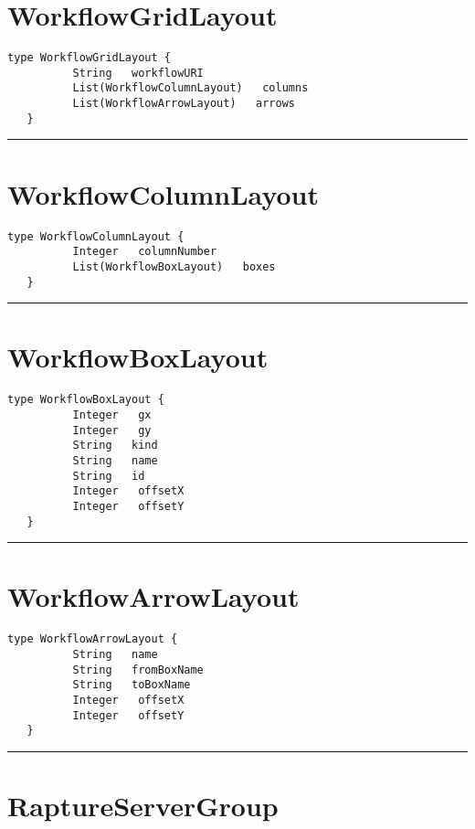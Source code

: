 \section{WorkflowGridLayout}
\label{type:WorkflowGridLayout}

\begin{lstlisting}[style=nonumbers]
   type WorkflowGridLayout {
          String   workflowURI
          List(WorkflowColumnLayout)   columns
          List(WorkflowArrowLayout)   arrows
   }
\end{lstlisting}

\rule{12cm}{2pt}
\section{WorkflowColumnLayout}
\label{type:WorkflowColumnLayout}

\begin{lstlisting}[style=nonumbers]
   type WorkflowColumnLayout {
          Integer   columnNumber
          List(WorkflowBoxLayout)   boxes
   }
\end{lstlisting}

\rule{12cm}{2pt}
\section{WorkflowBoxLayout}
\label{type:WorkflowBoxLayout}

\begin{lstlisting}[style=nonumbers]
   type WorkflowBoxLayout {
          Integer   gx
          Integer   gy
          String   kind
          String   name
          String   id
          Integer   offsetX
          Integer   offsetY
   }
\end{lstlisting}

\rule{12cm}{2pt}
\section{WorkflowArrowLayout}
\label{type:WorkflowArrowLayout}

\begin{lstlisting}[style=nonumbers]
   type WorkflowArrowLayout {
          String   name
          String   fromBoxName
          String   toBoxName
          Integer   offsetX
          Integer   offsetY
   }
\end{lstlisting}

\rule{12cm}{2pt}
\section{RaptureServerGroup}
\label{type:RaptureServerGroup}

